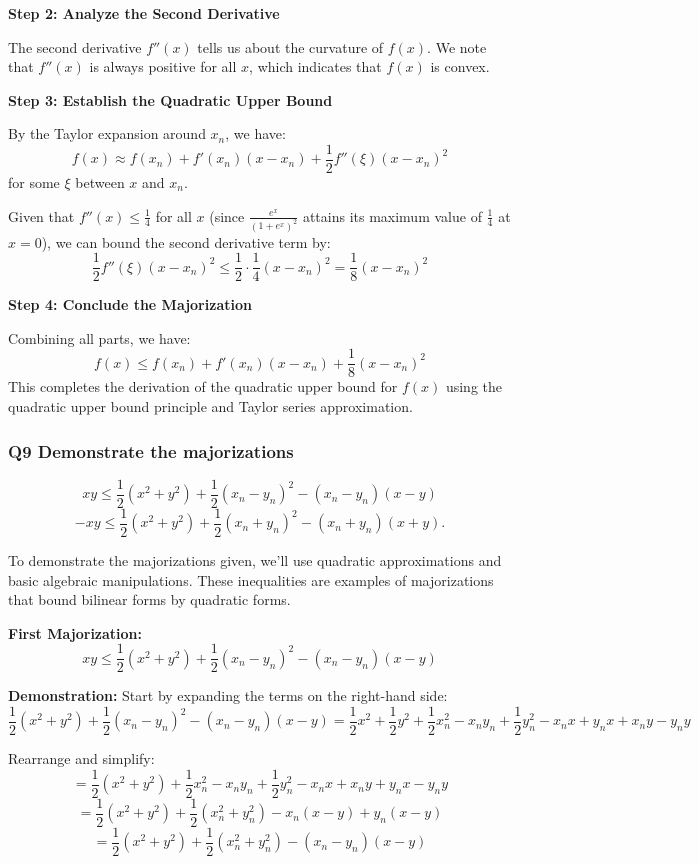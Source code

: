 \documentclass[8pt]{article}
\begin{document}
\textbf{Step 2: Analyze the Second Derivative}

The second derivative \( f''(x) \) tells us about the curvature of \( f(x) \). We note that \( f''(x) \) is always positive for all \( x \), which indicates that \( f(x) \) is convex.

\textbf{Step 3: Establish the Quadratic Upper Bound}

By the Taylor expansion around \( x_n \), we have:
\[
f(x) \approx f(x_n) + f'(x_n)(x - x_n) + \frac{1}{2}f''(\xi)(x - x_n)^2
\]
for some \( \xi \) between \( x \) and \( x_n \).

Given that \( f''(x) \leq \frac{1}{4} \) for all \( x \) (since \( \frac{e^x}{(1 + e^x)^2} \) attains its maximum value of \( \frac{1}{4} \) at \( x = 0 \)), we can bound the second derivative term by:
\[
\frac{1}{2}f''(\xi)(x - x_n)^2 \leq \frac{1}{2} \cdot \frac{1}{4} (x - x_n)^2 = \frac{1}{8} (x - x_n)^2
\]

\textbf{Step 4: Conclude the Majorization}

Combining all parts, we have:
\[
f(x) \leq f(x_n) + f'(x_n)(x - x_n) + \frac{1}{8} (x - x_n)^2
\]
This completes the derivation of the quadratic upper bound for \( f(x) \) using the quadratic upper bound principle and Taylor series approximation.

\subsubsection*{Q9 Demonstrate the majorizations}
\[
xy \leq \frac{1}{2} (x^2 + y^2) + \frac{1}{2} (x_n - y_n)^2 - (x_n - y_n)(x - y)
\]
\[
-xy \leq \frac{1}{2} (x^2 + y^2) + \frac{1}{2} (x_n + y_n)^2 - (x_n + y_n)(x + y).
\]

To demonstrate the majorizations given, we'll use quadratic approximations and basic algebraic manipulations. These inequalities are examples of majorizations that bound bilinear forms by quadratic forms.

\textbf{First Majorization:}
\[
xy \leq \frac{1}{2} (x^2 + y^2) + \frac{1}{2} (x_n - y_n)^2 - (x_n - y_n)(x - y)
\]

\textbf{Demonstration:}
Start by expanding the terms on the right-hand side:
\[
\frac{1}{2} (x^2 + y^2) + \frac{1}{2} (x_n - y_n)^2 - (x_n - y_n)(x - y) = \frac{1}{2} x^2 + \frac{1}{2} y^2 + \frac{1}{2} x_n^2 - x_ny_n + \frac{1}{2} y_n^2 - x_nx + y_nx + x_ny - y_ny
\]

Rearrange and simplify:
\[
= \frac{1}{2} (x^2 + y^2) + \frac{1}{2} x_n^2 - x_ny_n + \frac{1}{2} y_n^2 - x_nx + x_ny + y_nx - y_ny
\]
\[
= \frac{1}{2} (x^2 + y^2) + \frac{1}{2} (x_n^2 + y_n^2) - x_n(x - y) + y_n(x - y)
\]
\[
= \frac{1}{2} (x^2 + y^2) + \frac{1}{2} (x_n^2 + y_n^2) - (x_n - y_n)(x - y)
\]
\end{document}

